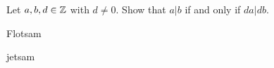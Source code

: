 \begin{statement}{1.1}
Let $a,b,d \in \mathbb Z$ with $d\ne 0$. Show that $a | b$ if and only if  $da | db$.
\end{statement}

Flotsam

jetsam

